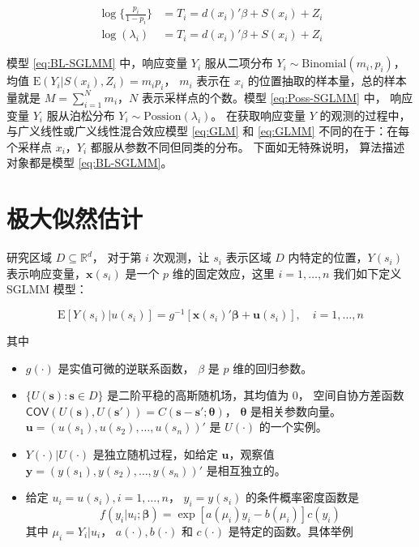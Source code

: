 \documentclass[12pt,a4paper,UTF8,twoside]{book}
\providecommand{\tightlist}{%
  \setlength{\itemsep}{0pt}\setlength{\parskip}{0pt}}
\theoremstyle{definition}
\theoremstyle{definition}
\theoremstyle{definition}
\theoremstyle{remark}
\begin{document}
\begin{align}
\log\{\frac{p_i}{1-p_i}\} & = T_{i} = d(x_i)'\beta + S(x_i) + Z_i  \label{eq:BL-SGLMM}\\
\log(\lambda_i)           & = T_{i} = d(x_i)'\beta + S(x_i) + Z_i  \label{eq:Poss-SGLMM}
\end{align}

\noindent 模型 \eqref{eq:BL-SGLMM} 中，响应变量 \(Y_i\) 服从二项分布
\(Y_i \sim \mathrm{Binomial}(m_i,p_i)\)， 均值
\(\mathrm{E}(Y_i|S(x_i),Z_i)=m_{i}p_{i}\)， \(m_i\) 表示在 \(x_i\)
的位置抽取的样本量，总的样本量就是 \(M=\sum_{i=1}^{N}m_i\)，\(N\)
表示采样点的个数。模型 \eqref{eq:Poss-SGLMM} 中， 响应变量 \(Y_i\)
服从泊松分布 \(Y_i \sim \mathrm{Possion}(\lambda_i)\)。 在获取响应变量
\(Y\) 的观测的过程中，与广义线性或广义线性混合效应模型 \eqref{eq:GLM} 和
\eqref{eq:GLMM} 不同的在于：在每个采样点 \(x_i\)，\(Y_i\)
都服从参数不同但同类的分布。 下面如无特殊说明， 算法描述对象都是模型
\eqref{eq:BL-SGLMM}。

\hypertarget{mle}{%
\section{极大似然估计}\label{mle}}

研究区域 \(D \subseteq \mathbb{R}^d\)， 对于第 \(i\) 次观测，让 \(s_i\)
表示区域 \(D\) 内特定的位置，\(Y(s_i)\)
表示响应变量，\(\mathbf{x}(s_i)\) 是一个 \(p\) 维的固定效应，这里
\(i = 1, \ldots, n\) 我们如下定义 SGLMM 模型：

\[
\mathrm{E}[Y(s_i)|u(s_i)] = g^{-1}[\mathbf{x}(s_i)'\boldsymbol{\beta} + \mathbf{u}(s_i)], \quad i = 1,\ldots,n
\]

\noindent 其中

\begin{itemize}
\tightlist
\item
  \(g(\cdot)\) 是实值可微的逆联系函数， \(\beta\) 是 \(p\)
  维的回归参数。
\item
  \(\{U(\mathbf{s}): \mathbf{s} \in D\}\)
  是二阶平稳的高斯随机场，其均值为 0， 空间自协方差函数
  \(\mathsf{COV}(U(\mathbf{s}),U(\mathbf{s}')) = C(\mathbf{s} - \mathbf{s}'; \boldsymbol{\theta})\)，
  \(\boldsymbol{\theta}\) 是相关参数向量。
  \(\mathbf{u} = (u(s_1),u(s_2),\ldots,u(s_n))'\) 是 \(U(\cdot)\)
  的一个实例。
\item
  \(Y(\cdot)|U(\cdot)\) 是独立随机过程，如给定 \(\mathbf{u}\)，观察值
  \(\mathbf{y} = (y(s_1),y(s_2),\ldots,y(s_n))'\) 是相互独立的。
\item
  给定 \(u_i = u(s_i), i = 1, \ldots, n\)， \(y_i = y(s_i)\)
  的条件概率密度函数是
  \[f(y_i|u_i;\boldsymbol{\beta}) = \exp[a(\mu_i)y_i - b(\mu_i)]c(y_i)\]
  其中 \(\mu_i = Y_i|u_i\)， \(a(\cdot),b(\cdot)\) 和 \(c(\cdot)\)
  是特定的函数。具体举例 \citep{McCullagh1989}
\end{itemize}
\end{document}
